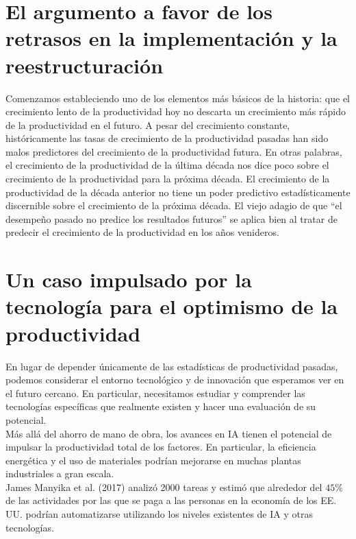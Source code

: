 \section{El argumento a favor de los retrasos en la implementación y la reestructuración}
Comenzamos estableciendo uno de los elementos más básicos de la historia: que el crecimiento lento de la productividad hoy no descarta un crecimiento más rápido de la productividad en el futuro. A pesar del crecimiento constante, históricamente las tasas de crecimiento de la productividad pasadas han sido malos predictores del crecimiento de la productividad futura. En otras palabras, el crecimiento de la productividad de la última década nos dice poco sobre el crecimiento de la productividad para la próxima década. El crecimiento de la productividad de la década anterior no tiene un poder predictivo estadísticamente discernible sobre el crecimiento de la próxima década. El viejo adagio de que “el desempeño pasado no predice los resultados futuros” se aplica bien al tratar de predecir el crecimiento de la productividad en los años venideros.

\section{Un caso impulsado por la tecnología para el optimismo de la productividad}
En lugar de depender únicamente de las estadísticas de productividad pasadas, podemos considerar el entorno tecnológico y de innovación que esperamos ver en el futuro cercano. En particular, necesitamos estudiar y comprender las tecnologías específicas que realmente existen y hacer una evaluación de su potencial.\\
Más allá del ahorro de mano de obra, los avances en IA tienen el potencial de impulsar la productividad total de los factores. En particular, la eficiencia energética y el uso de materiales podrían mejorarse en muchas plantas industriales a gran escala.\\
James Manyika et al. (2017) analizó 2000 tareas y estimó que alrededor del $45\%$ de las actividades por las que se paga a las personas en la economía de los EE. UU. podrían automatizarse utilizando los niveles existentes de IA y otras tecnologías.

